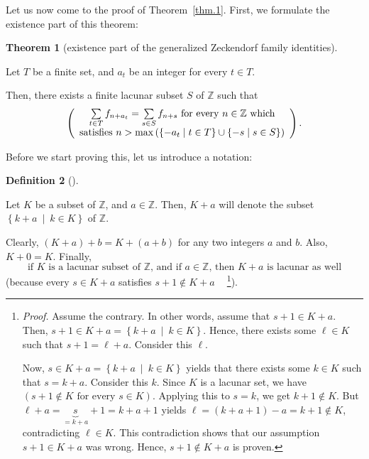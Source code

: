 \documentclass[numbers=enddot,12pt,final,onecolumn,notitlepage]{scrartcl}%
\numberwithin{exer}{section}
\theoremstyle{definition}
\newtheorem{theo}{Theorem}[section]
\newenvironment{theorem}[1][]
{\begin{theo}[#1]\begin{leftbar}}
{\end{leftbar}\end{theo}}
\newtheorem{defi}[theo]{Definition}
\newenvironment{definition}[1][]
{\begin{defi}[#1]\begin{leftbar}}
{\end{leftbar}\end{defi}}
\let\sumnonlimits\sum
\renewcommand{\sum}{\sumnonlimits\limits}
\begin{document}
Let us now come to the proof of Theorem~\ref{thm.1}. First, we formulate the existence
part of this theorem:

\begin{theorem}[existence part of the generalized Zeckendorf family
identities] \label{thm.8}
Let $T$ be a finite set, and $a_{t}$ be an integer for every
$t\in T$.

Then, there exists a finite lacunar subset $S$ of $\mathbb{Z}$ such that
\[
\left(
\begin{array}
[c]{c}%
\sum\limits_{t\in T}f_{n+a_{t}}=\sum\limits_{s\in S}f_{n+s}\text{ for every
}n\in\mathbb{Z}\text{ which}\\
\text{satisfies }n>\max\left(  \left\{  -a_{t}\mid t\in T\right\}
\cup\left\{  -s\mid s\in S\right\}  \right)
\end{array}
\right)  .
\]

\end{theorem}

Before we start proving this, let us introduce a notation:

\begin{definition}
Let $K$ be a subset of $\mathbb{Z}$, and $a\in\mathbb{Z}%
$. Then, $K+a$ will denote the subset $\left\{  k+a\ \mid\ k\in K\right\}  $
of $\mathbb{Z}$.
\end{definition}

Clearly, $\left(  K+a\right)  +b=K+\left(  a+b\right)  $ for any two integers
$a$ and $b$. Also, $K+0=K$. Finally,%
\begin{equation}
\text{if }K\text{ is a lacunar subset of }\mathbb{Z}\text{, and if }%
a\in\mathbb{Z}\text{, then }K+a\text{ is lacunar as well} \label{lacunar-plus}%
\end{equation}
(because every $s\in K+a$ satisfies $s+1\notin K+a\ \ \ \ $%
\footnote{\textit{Proof.} Assume the contrary. In other words, assume that
$s+1\in K+a$. Then, $s+1\in K+a=\left\{  k+a\ \mid\ k\in K\right\}  $. Hence,
there exists some $\ell\in K$ such that $s+1=\ell+a$. Consider this $\ell$.
\par
Now, $s\in K+a=\left\{  k+a\ \mid\ k\in K\right\}  $ yields that there exists
some $k\in K$ such that $s=k+a$. Consider this $k$. Since $K$ is a lacunar
set, we have $\left(  s+1\notin K\text{ for every }s\in K\right)  $. Applying
this to $s=k$, we get $k+1\notin K$. But $\ell+a=\underbrace{s}_{=k+a}%
+1=k+a+1$ yields $\ell=\left(  k+a+1\right)  -a=k+1\notin K$, contradicting
$\ell\in K$. This contradiction shows that our assumption $s+1\in K+a$ was
wrong. Hence, $s+1\notin K+a$ is proven.}).
\end{document}

